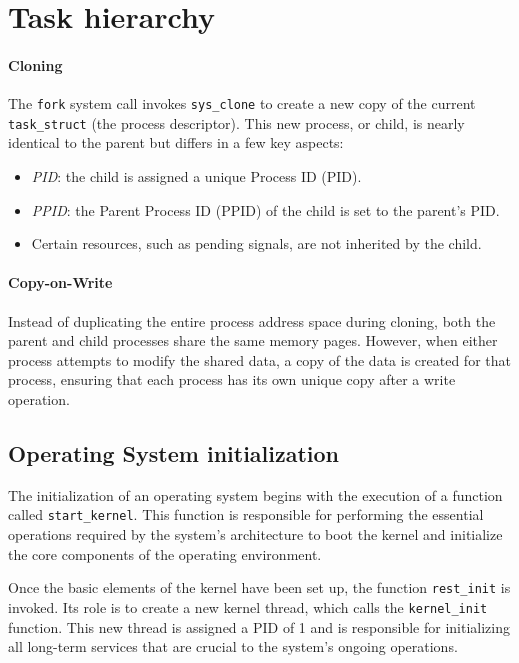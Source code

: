 \section{Task hierarchy}

\paragraph*{Cloning}
The \texttt{fork} system call invokes \texttt{sys\_clone} to create a new copy of the current \texttt{task\_struct} (the process descriptor). 
This new process, or child, is nearly identical to the parent but differs in a few key aspects:
\begin{itemize}
    \item \textit{PID}: the child is assigned a unique Process ID (PID).
    \item \textit{PPID}: the Parent Process ID (PPID) of the child is set to the parent's PID.
    \item Certain resources, such as pending signals, are not inherited by the child.
\end{itemize}

\paragraph*{Copy-on-Write}
Instead of duplicating the entire process address space during cloning, both the parent and child processes share the same memory pages. 
However, when either process attempts to modify the shared data, a copy of the data is created for that process, ensuring that each process has its own unique copy after a write operation.

\subsection{Operating System initialization}
The initialization of an operating system begins with the execution of a function called \texttt{start\_kernel}. 
This function is responsible for performing the essential operations required by the system's architecture to boot the kernel and initialize the core components of the operating environment.

Once the basic elements of the kernel have been set up, the function \texttt{rest\_init} is invoked. 
Its role is to create a new kernel thread, which calls the \texttt{kernel\_init} function. 
This new thread is assigned a PID of 1 and is responsible for initializing all long-term services that are crucial to the system's ongoing operations.

